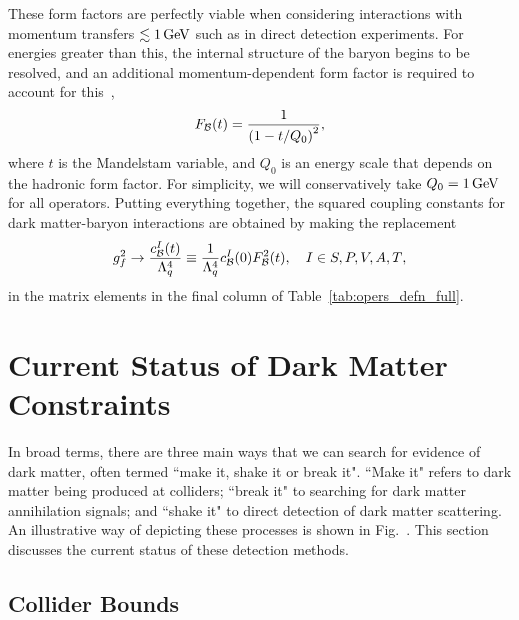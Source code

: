 These form factors are perfectly viable when considering interactions with momentum transfers $\lesssim 1{\rm \,GeV}$ such as in direct detection experiments. For energies greater than this, the internal structure of the baryon begins to be resolved, and an additional momentum-dependent form factor is required to account for this~\cite{_ElectromagneticStructureNucleon},
\begin{equation}
    F_{\cal B}(t) = \frac{1}{\left( 1 - t/Q_0\right)^2},
\end{equation}
where $t$ is the Mandelstam variable, and $Q_0$ is an energy scale that depends on the hadronic form factor. For simplicity, we will conservatively take $Q_0 = 1 {\rm \,GeV}$ for all operators.
Putting everything together, the squared coupling constants for dark matter-baryon interactions are obtained by making the replacement
\begin{equation}
    g_f^2 \rightarrow \frac{c^I_{\cal B}(t)}{\Lambda_q^4} \equiv \frac{1}{\Lambda_q^4}c_{\cal B}^I(0)F^2_{\cal B}(t),\quad I\in {S, P, V, A, T},
\end{equation}
in the matrix elements in the final column of Table~\ref{tab:opers_defn_full}.



\section{Current Status of Dark Matter Constraints}

In broad terms, there are three main ways that we can search for evidence of dark matter, often termed ``make it, shake it or break it". ``Make it" refers to dark matter being produced at colliders; ``break it" to searching for dark matter annihilation signals; and ``shake it" to direct detection of dark matter scattering. An illustrative way of depicting these processes is shown in Fig.~. This section discusses the current status of these detection methods. 


\subsection{Collider Bounds}


